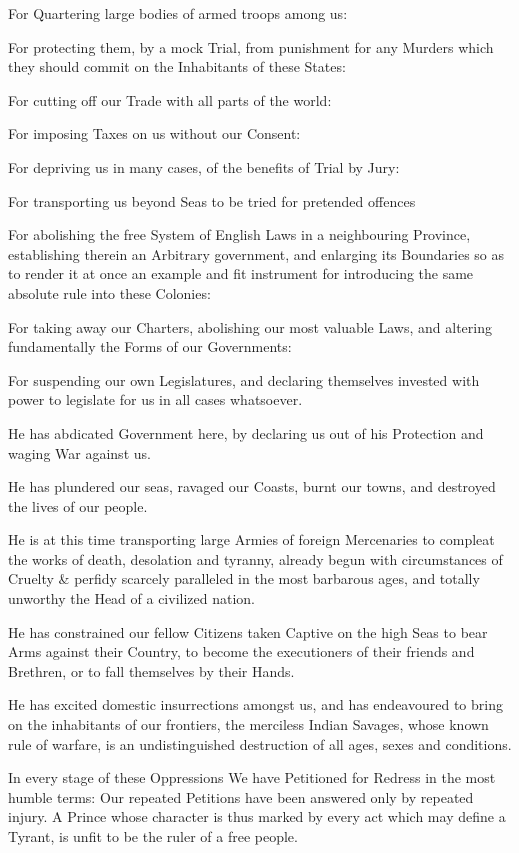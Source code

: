 \documentclass[a4paper,landscape,10pt]{article}
\begin{document}
For Quartering large bodies of armed troops among us:

For protecting them, by a mock Trial,
from punishment for any Murders
which they should commit on the Inhabitants of these States:

For cutting off our Trade with all parts of the world:

For imposing Taxes on us without our Consent:

For depriving us in many cases, of the benefits of Trial by Jury:

For transporting us beyond Seas to be tried for pretended offences

For abolishing the free System of English Laws in a neighbouring Province,
establishing therein an Arbitrary government,
and enlarging its Boundaries so as to render it at once an example and fit instrument
for introducing the same absolute rule into these Colonies:

For taking away our Charters,
abolishing our most valuable Laws,
and altering fundamentally the Forms of our Governments:

For suspending our own Legislatures,
and declaring themselves invested with power to legislate for us in all cases whatsoever.

He has abdicated Government here,
by declaring us out of his Protection and waging War against us.

He has plundered our seas,
ravaged our Coasts,
burnt our towns,
and destroyed the lives of our people.

He is at this time transporting large Armies of foreign Mercenaries
to compleat the works of death, desolation and tyranny,
already begun with circumstances of Cruelty \& perfidy
scarcely paralleled in the most barbarous ages,
and totally unworthy the Head of a civilized nation.

He has constrained our fellow Citizens taken Captive on the high Seas
to bear Arms against their Country,
to become the executioners of their friends and Brethren,
or to fall themselves by their Hands.

He has excited domestic insurrections amongst us,
and has endeavoured to bring on the inhabitants of our frontiers,
the merciless Indian Savages,
whose known rule of warfare,
is an undistinguished destruction of all ages, sexes and conditions.

In every stage of these Oppressions
We have Petitioned for Redress in the most humble terms:
Our repeated Petitions have been answered only by repeated injury.
A Prince whose character is thus marked by every act which may define a Tyrant,
is unfit to be the ruler of a free people.
\end{document}
